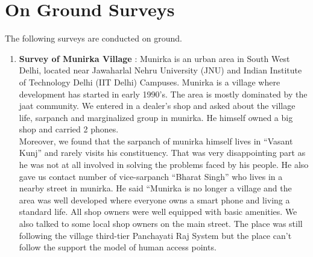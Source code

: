 \section{On Ground Surveys}
The following surveys are conducted on ground.
\begin{enumerate}
\item \textbf {Survey of Munirka Village} : Munirka is an urban area in South West Delhi, located near Jawaharlal Nehru
University (JNU) and Indian Institute of Technology Delhi (IIT Delhi)
Campuses. Munirka is a village where development has started in early 1990’s.
The area is mostly dominated by the jaat community. We entered in a dealer’s shop
and asked about the village life, sarpanch and marginalized group in munirka. He
himself owned a big shop and carried 2 phones.
\ \\
Moreover, we found that the sarpanch of munirka himself lives in “Vasant Kunj”
and rarely visits his constituency. That was very disappointing part as he was not
at all involved in solving the problems faced by his people. He also gave us contact
number of vice-sarpanch “Bharat Singh” who lives in a nearby street in munirka.
He said “Munirka is no longer a village and the area was well developed where
everyone owns a smart phone and living a standard life. All shop owners were well
equipped with basic amenities. We also talked to some local shop owners on the
main street. The place was still following the village third-tier Panchayati Raj
System but the place can’t follow the support the model of human access points.


\end{enumerate}
